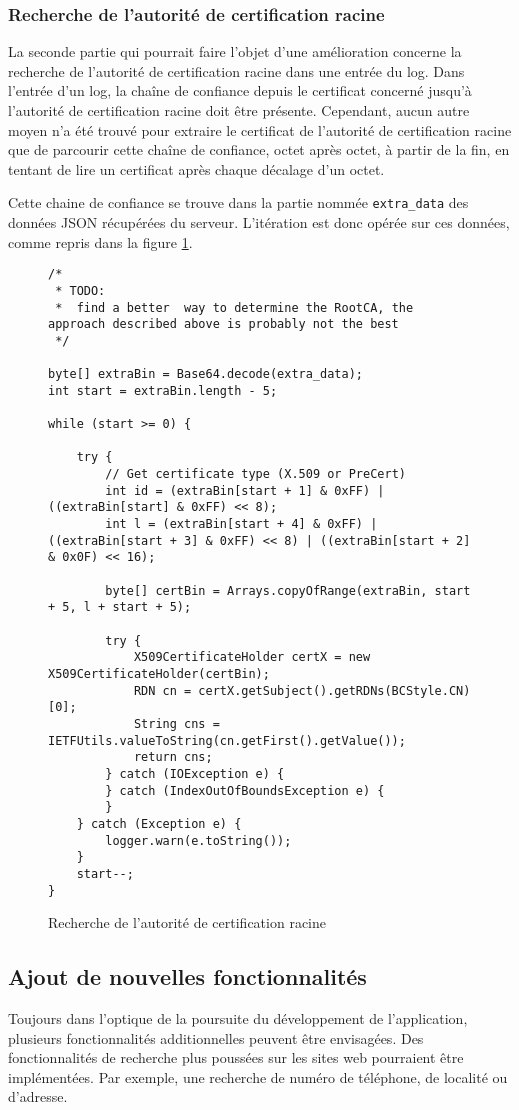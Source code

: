\documentclass{article}
\begin{document}
\subsubsection{Recherche de l'autorité de certification racine}

La seconde partie qui pourrait faire l'objet d'une amélioration concerne la recherche de l'autorité de certification racine dans une entrée du log.  Dans l'entrée d'un log, la chaîne de confiance depuis le certificat concerné jusqu'à l'autorité de certification racine doit être présente.  Cependant, aucun autre moyen n'a été trouvé pour extraire le certificat de l'autorité de certification racine que de parcourir cette chaîne de confiance, octet après octet, à partir de la fin, en tentant de lire un certificat après chaque décalage d'un octet.

Cette chaine de confiance se trouve dans la partie nommée \texttt{extra_data} des données JSON récupérées du serveur.  L'itération est donc opérée sur ces données, comme repris dans la figure \ref{ca-fig}.  

\begin{figure}
\centering
\begin{verbatim}
/*
 * TODO:
 *  find a better  way to determine the RootCA, the approach described above is probably not the best
 */

byte[] extraBin = Base64.decode(extra_data);
int start = extraBin.length - 5;

while (start >= 0) {

    try {
        // Get certificate type (X.509 or PreCert)
        int id = (extraBin[start + 1] & 0xFF) | ((extraBin[start] & 0xFF) << 8);
        int l = (extraBin[start + 4] & 0xFF) | ((extraBin[start + 3] & 0xFF) << 8) | ((extraBin[start + 2] & 0x0F) << 16);

        byte[] certBin = Arrays.copyOfRange(extraBin, start + 5, l + start + 5);

        try {
            X509CertificateHolder certX = new X509CertificateHolder(certBin);
            RDN cn = certX.getSubject().getRDNs(BCStyle.CN)[0];
            String cns = IETFUtils.valueToString(cn.getFirst().getValue());
            return cns;
        } catch (IOException e) {
        } catch (IndexOutOfBoundsException e) {
        }
    } catch (Exception e) {
        logger.warn(e.toString());
    }
    start--;
}
\end{verbatim}
\caption{Recherche de l'autorité de certification racine}
\label{ca-fig}
\end{figure}

\subsection{Ajout de nouvelles fonctionnalités}

Toujours dans l'optique de la poursuite du développement de l'application, plusieurs fonctionnalités additionnelles peuvent être envisagées.  Des fonctionnalités de recherche plus poussées sur les sites web pourraient être implémentées.  Par exemple, une recherche de numéro de téléphone, de localité ou d'adresse.
\end{document}
